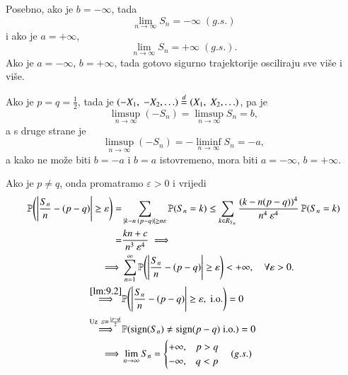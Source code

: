 \begin{pr}
    Posebno, ako je $b = -\infty$, tada
    \begin{equation*}
        \lim\limits_{n  \to \infty} S_n = -\infty \; (g.s.)
    \end{equation*}
    i ako je $a = + \infty$,
    \begin{equation*}
        \lim\limits_{n \to \infty} S_n = +\infty \; (g.s.).
    \end{equation*}
    Ako je $a = -\infty$, $b = +\infty$, tada gotovo sigurno trajektorije osciliraju sve vi\v se i vi\v se.

    Ako je $p = q = \frac{1}{2}$, tada je $(-X_1, \; -X_2, \ldots) \overset{d}{=} (X_1, \; X_2, \ldots)$, pa je
    \begin{equation*}
        \limsup\limits_{n \to \infty} (-S_n) = \limsup\limits_{n \to \infty} S_n = b,
    \end{equation*}
    a s druge strane je
    \begin{equation*}
        \limsup\limits_{n \to \infty} (-S_n) = - \liminf\limits_{n \to \infty} S_n = -a,
    \end{equation*}
    a kako ne mo\v ze biti $b = -a$ i $b = a$ istovremeno, mora biti $a = -\infty$, $b = +\infty$.

    Ako je $p \neq q$, onda promatramo $\varepsilon > 0$ i vrijedi
    \begin{equation*}
        \begin{aligned}
            \mathbb{P} \Bigg( \Bigg|\frac{S_n}{n} - (p - q) \Bigg| \geq \varepsilon \Bigg) =& \sum\limits_{|k - n \: (p-q)| \geq n \varepsilon}^{} \mathbb{P}({S_n = k}) \leq \sum\limits_{k \in R_{S_n}}^{} \frac{(k - n(p-q))^4}{n^4 \: \varepsilon^4} \: \mathbb{P}({S_n = k})\\
            =& \frac{k n + c}{n^3 \: \varepsilon^4} \implies\\
            \implies & \sum\limits_{n = 1}^{\infty} \mathbb{P} \Bigg( \Bigg| \frac{S_n}{n} - (p - q) \Bigg| \geq \varepsilon \Bigg) < + \infty, \quad \forall \varepsilon > 0.\\
            \overset{\ref{lm:9.2}}{\implies} & \mathbb{P} \Bigg( \Bigg| \frac{S_n}{n} - (p - q) \Bigg| \geq \varepsilon, \; \mathrm{i.o.} \Bigg) = 0\\
            \overset{\textnormal{Uz }\; \varepsilon = \frac{|p - q|}{2}}{\implies} & \mathbb{P}({\operatorname{sign} (S_n) \neq \operatorname{sign} (p - q) \; \mathrm{i.o.}}) = 0\\
            \implies & \lim\limits_{n \to \infty} S_n
            =
            \begin{cases}
                + \infty, &p > q\\
                - \infty, &q < p
            \end{cases}
            \quad (g.s.)
        \end{aligned}
    \end{equation*}
\end{pr}


